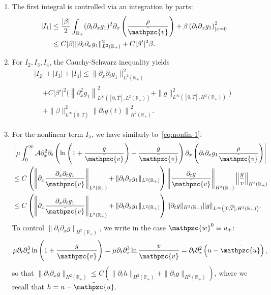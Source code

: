 \documentclass[AHL,Unicode,longabstracts,published]{cedram}
\newcommand{\R}{\mathbb{R}}
\newcommand{\p}{\partial}
\newcommand{\bv}{\bar{\mathpzc{v}}}
\newcommand{\bu}{\bar{\mathpzc{u}}}
\newcommand{\cA}{\mathcal A}
\newcommand{\tw}{\mathpzc{w}}
\begin{document}
\begin{enumerate}
\item The first integral is controlled via an integration by parts:
\begin{align*}
|I_1| & \leq \dfrac{|\beta|}{2} \int_{\R_+} (\partial_t \partial_x g_1)^2 \partial_x \left(\frac{\rho}{\bv}\right) + \beta \left(\partial_t \partial_x g_1\right)^2_{|x=0} \\
& \leq C|\beta| \|\partial_t \partial_x g_1\|_{L^2(\R_+)}^2 + C |\beta'|^2 \beta.
\end{align*}
\item For $I_2, I_3, I_4$, the Cauchy-Schwarz inequality yields
\begin{multline*}
|I_2| + |I_3| + |I_4| \leq \|\partial_x \partial_t g_1\|_{L^2(\R_+)}^2 \\
\begin{aligned}
& + C|\beta'|^2 \Big(\left\|\partial^2_x g_1\right\|_{L^\infty\left([0,\overline{T}],L^2(\R_+)\right)}^2 + \|g\|_{L^\infty\left([0,\overline{T}],H^2(\R_+)\right)}^2 \Big) \\
& + \|\beta\|_{L^\infty\left(0,\overline{T}\right)}^2 \left\|\partial_t g(t)\right\|_{H^2(\R_+)}^2.
\end{aligned}
\end{multline*}

\item For the nonlinear term $I_5$, we have similarly to~\eqref{eq:nonlin-1}:
\begin{multline*}
\left| \mu \int_0^\infty \cA \partial^2_x \partial_t \left(\ln \left(1 + \frac{g}{\bv}\right) - \frac{g}{\bv}\right)\p_x\left(\partial_t \partial_x g_1 \dfrac{\rho}{\bv}\right)\right|\\
\begin{aligned}
& \leq C \left(\left\| \p_x \frac{\p_x \p_t g_1}{\bv} \right\|_{L^2(\R_+)} + \|\p_t \p_x g_1\|_{L^2(\R_+)}\right) {
\left\| \frac{\p_t g}{\bv}\right\|_{H^3(\R_+)} \left\| \frac{g}{v}\right\|_{H^3(\R_+)}}\\
&\leq C \left(\left\| \p_x \frac{\p_x \p_t g_1}{\bv} \right\|_{L^2(\R_+)} + \|\p_t \p_x g_1\|_{L^2(\R_+)}\right) \|\p_t g\|_{H^3(\R_+)} \| g\|_{L^\infty\left([0, \overline{T}], H^3(\R_+)\right)}.
\end{aligned}
\end{multline*}
To control $\|\partial_t \p_x g\|_{H^2(\R_+)}$, we write in the case $\tw^0\equiv u_+$:
\[
\mu \p_t \p_x^3 \ln\left(1 + \frac{g}{\bv}\right)=\mu \partial_t \partial^3_x \ln \frac{v}{\bv} = \partial_t \partial^2_x \left(u -\bu\right),
\]
so that $\|\partial_t \partial_x g\|_{H^2(\R_+)} \leq C(\|\partial_t h\|_{H^2(\R_+)} + \|\p_t g\|_{H^2(\R_+)})$, where we recall that $h = u -\bu$.
\end{enumerate}
\end{document}
